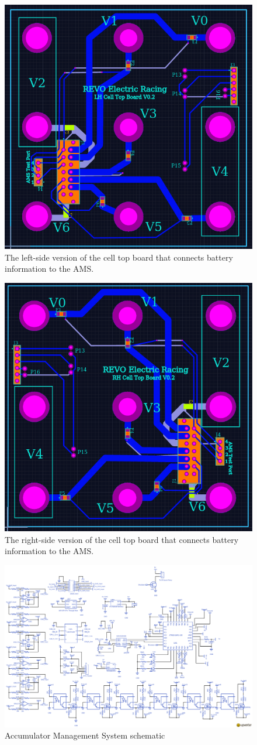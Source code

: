 \documentclass{article}
\begin{document}
        \begin{figure}[H]
            \centering
            \includegraphics[width = 0.5 \textwidth]{CellTopLH}
            \caption{The left-side version of the cell top board that connects battery information to the AMS.}
            \label{celltopboard}
        \end{figure}

        \begin{figure}[H]
            \centering
            \includegraphics[width = 0.5 \textwidth]{CellTopRH}
            \caption{The right-side version of the cell top board that connects battery information to the AMS.}
            \label{celltopboard}
        \end{figure}

        \begin{figure}
            \includegraphics[width=\textheight]{bmsschem}
            \caption{Accumulator Management System schematic}
            \label{amsschem}
        \end{figure}
\end{document}
